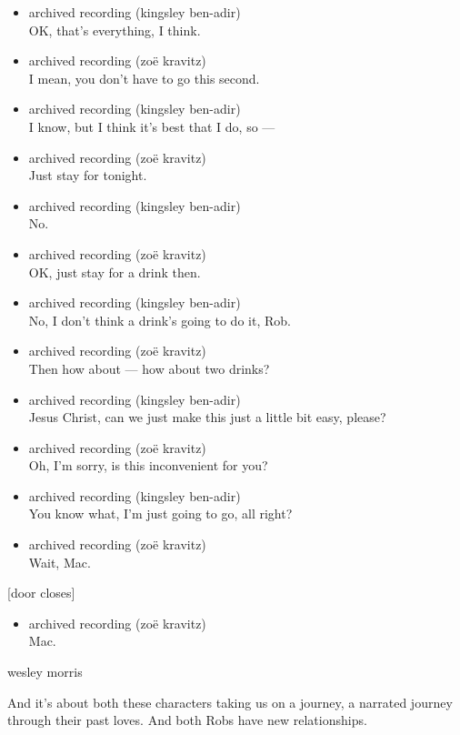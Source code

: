 \begin{itemize}
\item
  archived recording (kingsley ben-adir)\\
  OK, that's everything, I think.
\item
  archived recording (zoë kravitz)\\
  I mean, you don't have to go this second.
\item
  archived recording (kingsley ben-adir)\\
  I know, but I think it's best that I do, so ---
\item
  archived recording (zoë kravitz)\\
  Just stay for tonight.
\item
  archived recording (kingsley ben-adir)\\
  No.
\item
  archived recording (zoë kravitz)\\
  OK, just stay for a drink then.
\item
  archived recording (kingsley ben-adir)\\
  No, I don't think a drink's going to do it, Rob.
\item
  archived recording (zoë kravitz)\\
  Then how about --- how about two drinks?
\item
  archived recording (kingsley ben-adir)\\
  Jesus Christ, can we just make this just a little bit easy, please?
\item
  archived recording (zoë kravitz)\\
  Oh, I'm sorry, is this inconvenient for you?
\item
  archived recording (kingsley ben-adir)\\
  You know what, I'm just going to go, all right?
\item
  archived recording (zoë kravitz)\\
  Wait, Mac.
\end{itemize}

{[}door closes{]}

\begin{itemize}
\tightlist
\item
  archived recording (zoë kravitz)\\
  Mac.
\end{itemize}

wesley morris

And it's about both these characters taking us on a journey, a narrated
journey through their past loves. And both Robs have new relationships.

